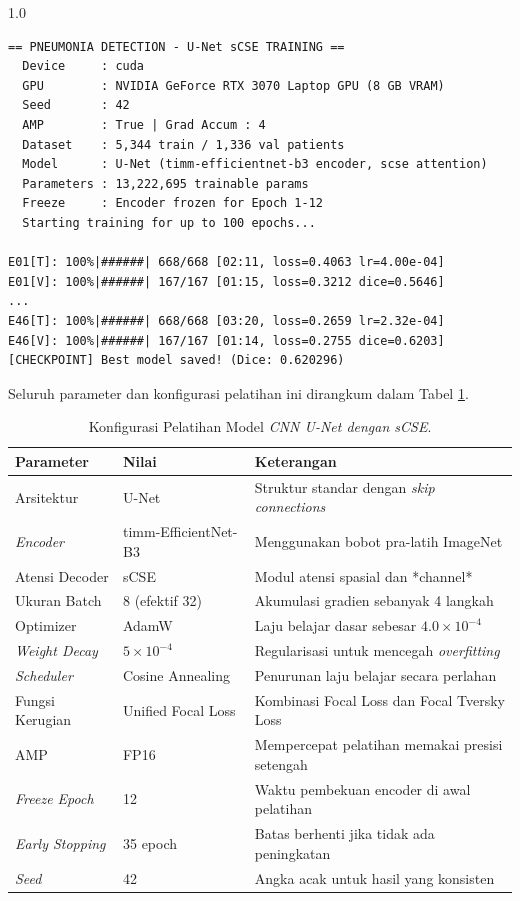 \documentclass[12pt,a4paper,oneside]{book}
\begin{document}
\begin{spacing}{1.0}
\begin{lstlisting}
== PNEUMONIA DETECTION - U-Net sCSE TRAINING ==
  Device     : cuda
  GPU        : NVIDIA GeForce RTX 3070 Laptop GPU (8 GB VRAM)
  Seed       : 42
  AMP        : True | Grad Accum : 4
  Dataset    : 5,344 train / 1,336 val patients
  Model      : U-Net (timm-efficientnet-b3 encoder, scse attention)
  Parameters : 13,222,695 trainable params
  Freeze     : Encoder frozen for Epoch 1-12
  Starting training for up to 100 epochs...

E01[T]: 100%|######| 668/668 [02:11, loss=0.4063 lr=4.00e-04]
E01[V]: 100%|######| 167/167 [01:15, loss=0.3212 dice=0.5646]
...
E46[T]: 100%|######| 668/668 [03:20, loss=0.2659 lr=2.32e-04]
E46[V]: 100%|######| 167/167 [01:14, loss=0.2755 dice=0.6203]
[CHECKPOINT] Best model saved! (Dice: 0.620296)

\end{lstlisting}
\end{spacing}

Seluruh parameter dan konfigurasi pelatihan ini dirangkum dalam Tabel \ref{tab:training_config}.

\begin{table}[htbp]
  \centering
  \caption{Konfigurasi Pelatihan Model \textit{CNN U-Net dengan sCSE}.}
  \label{tab:training_config}
  \begin{tabularx}{\textwidth}{llX}
    \toprule
    \textbf{Parameter} & \textbf{Nilai} & \textbf{Keterangan} \\
    \midrule
    Arsitektur         & U-Net         & Struktur standar dengan \textit{skip connections} \\
    \textit{Encoder}   & timm-EfficientNet-B3 & Menggunakan bobot pra-latih ImageNet \\
    Atensi Decoder     & sCSE           & Modul atensi spasial dan *channel* \\
    Ukuran Batch       & 8 (efektif 32) & Akumulasi gradien sebanyak 4 langkah \\
    Optimizer          & AdamW          & Laju belajar dasar sebesar $4.0 \times 10^{-4}$ \\
    \textit{Weight Decay} & $5 \times 10^{-4}$   & Regularisasi untuk mencegah \textit{overfitting} \\
    \textit{Scheduler} & Cosine Annealing & Penurunan laju belajar secara perlahan \\
    Fungsi Kerugian    & Unified Focal Loss & Kombinasi Focal Loss dan Focal Tversky Loss \\
    AMP                & FP16           & Mempercepat pelatihan memakai presisi setengah \\
    \textit{Freeze Epoch} & 12           & Waktu pembekuan encoder di awal pelatihan \\
    \textit{Early Stopping} & 35 epoch  & Batas berhenti jika tidak ada peningkatan \\
    \textit{Seed}      & 42             & Angka acak untuk hasil yang konsisten \\
    \bottomrule
  \end{tabularx}
\end{table}
\end{document}
